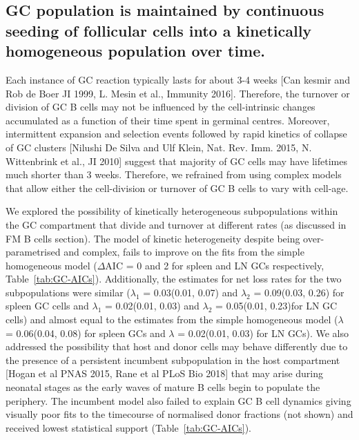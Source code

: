 \documentclass[11pt]{article}
\newcommand{\red}[1]{{\color{red}{#1}}}
\begin{document}
	\subsection*{GC population is maintained by continuous seeding of follicular cells into a kinetically homogeneous population over time.}
	Each instance of GC reaction typically lasts for about 3-4 weeks [Can kesmir and Rob de Boer JI 1999, L. Mesin et al., Immunity 2016].
	Therefore, the turnover or division of GC B cells may not be influenced by the cell-intrinsic changes accumulated as a function of their time spent in germinal centres.
	Moreover, intermittent expansion and selection events followed by rapid kinetics of collapse of GC clusters [Nilushi De Silva and Ulf Klein, Nat. Rev. Imm. 2015, N. Wittenbrink  et al., JI 2010] suggest that majority of GC cells may have lifetimes much shorter than 3 weeks.
	Therefore, we refrained from using complex models that allow either the cell-division or turnover of GC B cells to vary with cell-age.
	
	\red{I have fitted the age-structured model on GC cells and it fails to fit to LN GCs and show $\Delta$ AIC of 380 in spleen GCs.}
	
	We explored the possibility of kinetically heterogeneous subpopulations within the GC compartment that divide and turnover at different rates (as discussed in FM B cells section).
	The model of kinetic heterogeneity despite being over-parametrised and complex, fails to improve on the fits from the simple homogeneous model ($\Delta$AIC = 0 and 2 for spleen and LN GCs respectively, Table~\ref{tab:GC-AICs}).
	Additionally, the estimates for net loss rates for the two subpopulations were similar ($\lambda_1$ = 0.03(0.01, 0.07) and $\lambda_2$ = 0.09(0.03, 0.26) for spleen GC cells and $\lambda_1$ = 0.02(0.01, 0.03)  and $\lambda_2$ = 0.05(0.01, 0.23)for LN GC cells) and almost equal to the estimates from the simple homogeneous model ($\lambda$ = 0.06(0.04, 0.08) for spleen GCs and $\lambda$ = 0.02(0.01, 0.03) for LN GCs).
	We also addressed the possibility that host and donor cells may behave differently due to the presence of a persistent incumbent subpopulation in the host compartment [Hogan et al PNAS 2015, Rane et al PLoS Bio 2018] that may arise during neonatal stages as the early waves of mature B cells begin to populate the periphery.
	The incumbent model also failed to explain GC B cell dynamics giving visually poor fits to the timecourse of normalised donor fractions (not shown) and received lowest statistical support (Table~\ref{tab:GC-AICs}).
	
\end{document}
